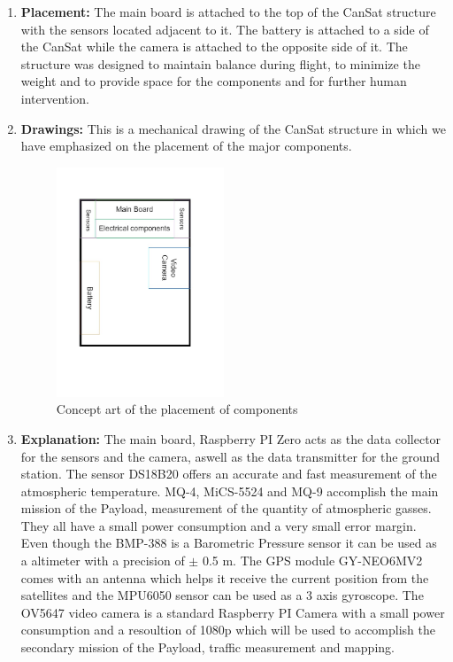 \documentclass[11pt]{article}
\begin{document}
\begin{enumerate}
\item \textbf{Placement:} The main board is attached to the top of the CanSat structure with the sensors located adjacent to it. The battery is attached to a side of the CanSat while the camera is attached to the opposite side of it. The structure was designed to maintain balance during flight, to minimize the weight and to provide space for the components and for further human intervention.
\vspace{0.25cm}
\item \textbf{Drawings:} This is a mechanical drawing of the CanSat structure in which we have emphasized on the placement of the major components.

\begin{figure}[H]
\includegraphics[width=5cm]{Component_placement}
\centering
\caption{Concept art of the placement of components}
\end{figure}

\item \textbf{Explanation:} The main board, Raspberry PI Zero acts as the data collector for the sensors and the camera, aswell as the data transmitter for the ground station. The sensor DS18B20 offers an accurate and fast measurement of the atmospheric temperature. MQ-4, MiCS-5524 and MQ-9 accomplish the main mission of the Payload, measurement of the quantity of atmospheric gasses. They all have a small power consumption and a very small error margin. Even though the BMP-388 is a Barometric Pressure sensor it can be used as a altimeter with a precision of $\pm$ 0.5 m. The GPS module GY-NEO6MV2 comes with an antenna which helps it receive the current position from the satellites and the MPU6050 sensor can be used as a 3 axis gyroscope. The OV5647 video camera is a standard Raspberry PI Camera with a small power consumption and a resoultion of 1080p which will be used to accomplish the secondary mission of the Payload, traffic measurement and mapping.

\end{enumerate}
\end{document}
